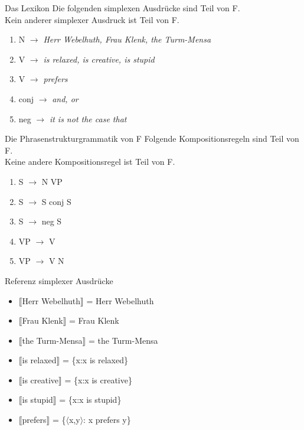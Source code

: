 \begin{frame}
  {Das Lexikon}
  \onslide<+->
  \onslide<+->
  Die folgenden simplexen Ausdrücke sind Teil von F.\\
  \onslide<+->
  Kein anderer simplexer Ausdruck ist Teil von F.\\
  \Halbzeile
  \begin{enumerate}[<+->]
    \item N $\rightarrow$ \emph{Herr Webelhuth, Frau Klenk, the Turm-Mensa} \label{lex01}
    \item V $\rightarrow$ \emph{is relaxed, is creative, is stupid} \label{lex02}
    \item V $\rightarrow$ \emph{prefers} \label{lex03}
    \item conj $\rightarrow$ \emph{and, or} \label{lex04}
    \item neg $\rightarrow$ \emph{it is not the case that} \label{lex05}
  \end{enumerate}
\end{frame}

\begin{frame}
  {Die Phrasenstrukturgrammatik von F}
  \onslide<+->
  \onslide<+->
  Folgende Kompositionsregeln sind Teil von F.\\
  Keine andere Kompositionsregel ist Teil von F.\\
  \Halbzeile
  \begin{enumerate}[<+->]
    \item S $\rightarrow$ N VP \label{syn01}
    \item S $\rightarrow$ S conj S \label{syn02}
    \item S $\rightarrow$ neg S \label{syn03}
    \item VP $\rightarrow$ V \label{syn04}
    \item VP $\rightarrow$ V N \label{syn05}
  \end{enumerate}
\end{frame}

\begin{frame}
  {Referenz simplexer Ausdrücke}
  \begin{itemize}[<+->]
    \item $\llbracket$Herr Webelhuth$\rrbracket$ = Herr Webelhuth \label{lexint01}
    \item $\llbracket$Frau Klenk$\rrbracket$ = Frau Klenk \label{lexint02}
    \item $\llbracket$the Turm-Mensa$\rrbracket$ = the Turm-Mensa \label{lexint03}
    \item $\llbracket$is relaxed$\rrbracket$ = \{x:x is relaxed\} \label{lexint04}
    \item $\llbracket$is creative$\rrbracket$ = \{x:x is creative\} \label{lexint05}
    \item $\llbracket$is stupid$\rrbracket$ = \{x:x is stupid\} \label{lexint06}
    \item $\llbracket$prefers$\rrbracket$ = \{$\langle$x,y$\rangle$: x prefers y\} \label{lexint07}
  \end{itemize}
\end{frame}

